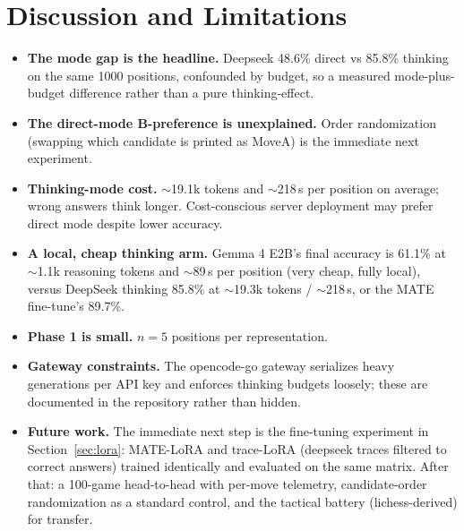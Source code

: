 \documentclass{article}
\begin{document}
\section{Discussion and Limitations}
\label{sec:discussion}
\begin{itemize}
\item \textbf{The mode gap is the headline.} Deepseek 48.6\% direct vs
  85.8\% thinking on the same 1000 positions, confounded by budget, so a
  measured mode-plus-budget difference rather than a pure
  thinking-effect.
\item \textbf{The direct-mode B-preference is unexplained.} Order
  randomization (swapping which candidate is printed as MoveA) is the
  immediate next experiment.
\item \textbf{Thinking-mode cost.} $\sim$19.1k tokens and $\sim$218\,s
  per position on average; wrong answers think longer. Cost-conscious
  server deployment may prefer direct mode despite lower accuracy.
\item \textbf{A local, cheap thinking arm.} Gemma 4 E2B's final accuracy
is 61.1\% at $\sim$1.1k reasoning tokens and $\sim$89\,s per position
(very cheap, fully local), versus DeepSeek thinking 85.8\% at
$\sim$19.3k tokens / $\sim$218\,s, or the MATE fine-tune's 89.7\%.
\item \textbf{Phase 1 is small.} $n{=}5$ positions per representation.
\item \textbf{Gateway constraints.} The opencode-go gateway serializes
  heavy generations per API key and enforces thinking budgets loosely;
  these are documented in the repository rather than hidden.
\item \textbf{Future work.} The immediate next step is the
  fine-tuning experiment in Section~\ref{sec:lora}: MATE-LoRA and
  trace-LoRA (deepseek traces filtered to correct answers) trained
  identically and evaluated on the same matrix. After that: a
  100-game head-to-head with per-move telemetry, candidate-order
  randomization as a standard control, and the tactical battery
  (lichess-derived) for transfer.
\end{itemize}
\end{document}
